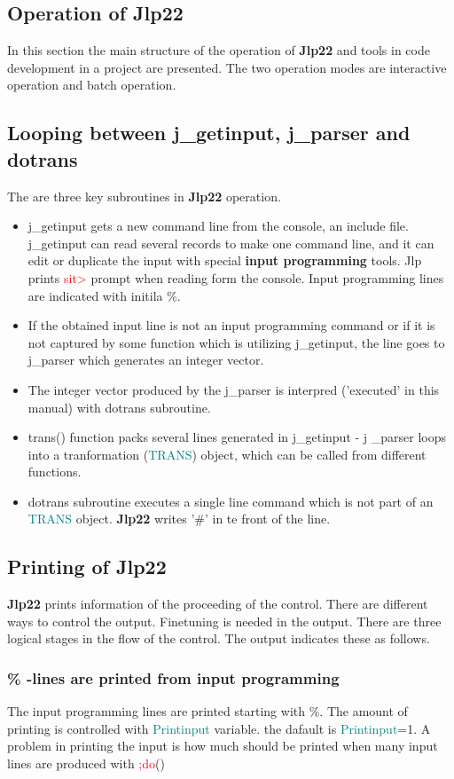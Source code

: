 {\begin{itemize}
\begin{itemize}
 
\section{Operation of \textbf{Jlp22}} 
\label{joperation} 
In this section the main structure of the operation of \textbf{Jlp22} and tools 
in code development in a project are presented. 
The two operation modes are interactive operation and batch operation. 
\subsection{Looping between j\_getinput, j\_parser and dotrans} 
\label{basicloop} 
The are three key subroutines in \textbf{Jlp22} operation. 
\begin{itemize} 
\item j\_getinput gets a new command line from the console, an include file. j\_getinput can 
read several records to make one command line, and it can edit or duplicate the input 
with special \textbf{input programming} tools. Jlp prints \textcolor{Red}{sit>} prompt 
when reading form the console. Input programming lines are indicated with initila \%. 
\item If the obtained input line is not an input programming command or if it is not 
captured by some function which is utilizing j\_getinput, the line goes to j\_parser which 
generates an integer vector. 
\item The integer vector produced by the j\_parser is interpred ('executed' in this manual) 
with dotrans subroutine. 
\item \textcolor{VioletRed}{trans}() function packs several lines generated in j\_getinput - j \_parser loops 
into a tranformation (\textcolor{teal}{TRANS}) object, which can be called from different functions. 
\item dotrans subroutine executes a single line command which is not part of an \textcolor{teal}{TRANS} object. 
\textbf{Jlp22} writes '\#' in te front of the line. 
\end{itemize} 
\subsection{Printing of \textbf{Jlp22}} 
\label{printing} 
\textbf{Jlp22} prints information of the proceeding of the control. There are different ways to control 
the output. Finetuning is needed in the output. There are three logical 
stages in the flow of the control. The output indicates these as follows. 
\subsubsection{\% -lines are printed from input programming} 
\label{printinpu} 
The input programming lines are printed starting with \%. 
The amount of printing is controlled with \textcolor{teal}{Printinput} variable. 
the dafault is \textcolor{teal}{Printinput}=1. A problem in printing the input is how much should be 
printed when many input lines are produced with \textcolor{Red}{;do}() 

\end{itemize}
\end{itemize}}
